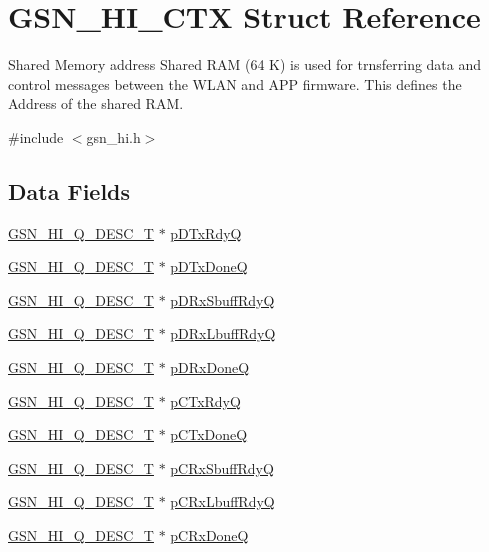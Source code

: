 \hypertarget{a00085}{
\section{GSN\_\-HI\_\-CTX Struct Reference}
\label{a00085}
}


Shared Memory address Shared RAM (64 K) is used for trnsferring data and control messages between the WLAN and APP firmware. This defines the Address of the shared RAM.  




{\ttfamily \#include $<$gsn\_\-hi.h$>$}

\subsection*{Data Fields}
\begin{DoxyCompactItemize}
\item 
\hyperlink{a00191}{GSN\_\-HI\_\-Q\_\-DESC\_\-T} $\ast$ \hyperlink{a00085_a5bae9ee90ebf87d01e751b7870ce7969}{pDTxRdyQ}
\item 
\hyperlink{a00191}{GSN\_\-HI\_\-Q\_\-DESC\_\-T} $\ast$ \hyperlink{a00085_a398f238a7e8b465687b31b5662b509e4}{pDTxDoneQ}
\item 
\hyperlink{a00191}{GSN\_\-HI\_\-Q\_\-DESC\_\-T} $\ast$ \hyperlink{a00085_a6b28fb8ac26b8ab3fbe508edcfb6187b}{pDRxSbuffRdyQ}
\item 
\hyperlink{a00191}{GSN\_\-HI\_\-Q\_\-DESC\_\-T} $\ast$ \hyperlink{a00085_a8bdeea2ec46e25ca2dde6fcde3d17ef0}{pDRxLbuffRdyQ}
\item 
\hyperlink{a00191}{GSN\_\-HI\_\-Q\_\-DESC\_\-T} $\ast$ \hyperlink{a00085_a530d01c3ee745926054e01e8cc690ccf}{pDRxDoneQ}
\item 
\hyperlink{a00191}{GSN\_\-HI\_\-Q\_\-DESC\_\-T} $\ast$ \hyperlink{a00085_a3013d653b790349c653bceeca0ab840d}{pCTxRdyQ}
\item 
\hyperlink{a00191}{GSN\_\-HI\_\-Q\_\-DESC\_\-T} $\ast$ \hyperlink{a00085_a8320fe53c3c7badf5055f94062578356}{pCTxDoneQ}
\item 
\hyperlink{a00191}{GSN\_\-HI\_\-Q\_\-DESC\_\-T} $\ast$ \hyperlink{a00085_ab20687f47d0ed918374f7bf6370bb279}{pCRxSbuffRdyQ}
\item 
\hyperlink{a00191}{GSN\_\-HI\_\-Q\_\-DESC\_\-T} $\ast$ \hyperlink{a00085_a79ab5491976d42cddf2dfeb015b8de89}{pCRxLbuffRdyQ}
\item 
\hyperlink{a00191}{GSN\_\-HI\_\-Q\_\-DESC\_\-T} $\ast$ \hyperlink{a00085_a7581bb1eb817dfb5fe24f45d1b80ea7f}{pCRxDoneQ}
\item 

\end{DoxyCompactItemize}
